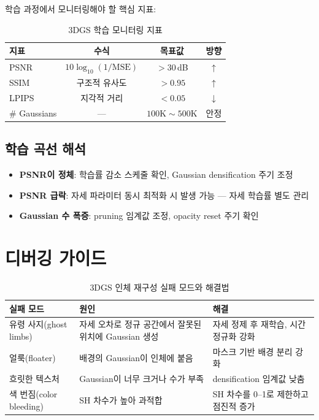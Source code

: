 \documentclass[11pt, a4paper]{report}
\begin{document}
학습 과정에서 모니터링해야 할 핵심 지표:

\begin{table}[H]
\centering
\caption{3DGS 학습 모니터링 지표}
\begin{tabular}{lccc}
\toprule
\textbf{지표} & \textbf{수식} & \textbf{목표값} & \textbf{방향} \\
\midrule
PSNR & $10\log_{10}(1/\text{MSE})$ & $> 30$\,dB & $\uparrow$ \\
SSIM & 구조적 유사도 & $> 0.95$ & $\uparrow$ \\
LPIPS & 지각적 거리 & $< 0.05$ & $\downarrow$ \\
\# Gaussians & --- & $100\text{K}\sim500\text{K}$ & 안정 \\
\bottomrule
\end{tabular}
\end{table}

\subsection{학습 곡선 해석}

\begin{itemize}[nosep]
  \item \textbf{PSNR이 정체}: 학습률 감소 스케줄 확인, Gaussian densification 주기 조정
  \item \textbf{PSNR 급락}: 자세 파라미터 동시 최적화 시 발생 가능 --- 자세 학습률 별도 관리
  \item \textbf{Gaussian 수 폭증}: pruning 임계값 조정, opacity reset 주기 확인
\end{itemize}

\section{디버깅 가이드}

\begin{table}[H]
\centering
\caption{3DGS 인체 재구성 실패 모드와 해결법}
\begin{tabularx}{\textwidth}{lXX}
\toprule
\textbf{실패 모드} & \textbf{원인} & \textbf{해결} \\
\midrule
유령 사지(ghost limbs) & 자세 오차로 정규 공간에서 잘못된 위치에 Gaussian 생성 & 자세 정제 후 재학습, 시간 정규화 강화 \\
얼룩(floater) & 배경의 Gaussian이 인체에 붙음 & 마스크 기반 배경 분리 강화 \\
흐릿한 텍스처 & Gaussian이 너무 크거나 수가 부족 & densification 임계값 낮춤 \\
색 번짐(color bleeding) & SH 차수가 높아 과적합 & SH 차수를 0--1로 제한하고 점진적 증가 \\
\bottomrule
\end{tabularx}
\end{table}
\end{document}

